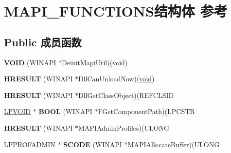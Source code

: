 \hypertarget{struct_m_a_p_i___f_u_n_c_t_i_o_n_s}{}\section{M\+A\+P\+I\+\_\+\+F\+U\+N\+C\+T\+I\+O\+N\+S结构体 参考}
\label{struct_m_a_p_i___f_u_n_c_t_i_o_n_s}
\subsection*{Public 成员函数}
\begin{DoxyCompactItemize}
\item 
\mbox{\label{struct_m_a_p_i___f_u_n_c_t_i_o_n_s_a7bc11772e8a393cb45c678e6265dc863}} 
{\bfseries V\+O\+ID} (W\+I\+N\+A\+PI $\ast$Deinit\+Mapi\+Util)(\hyperlink{interfacevoid}{void})
\item 
\mbox{\label{struct_m_a_p_i___f_u_n_c_t_i_o_n_s_ab2d2cef075f8a6b97ca29705ed10bcbe}} 
{\bfseries H\+R\+E\+S\+U\+LT} (W\+I\+N\+A\+PI $\ast$Dll\+Can\+Unload\+Now)(\hyperlink{interfacevoid}{void})
\item 
\mbox{\label{struct_m_a_p_i___f_u_n_c_t_i_o_n_s_adbef5dc7f5a28db9e40862bcf14affb4}} 
{\bfseries H\+R\+E\+S\+U\+LT} (W\+I\+N\+A\+PI $\ast$Dll\+Get\+Class\+Object)(R\+E\+F\+C\+L\+S\+ID
\item 
\mbox{\label{struct_m_a_p_i___f_u_n_c_t_i_o_n_s_a604dea537b95de631f6df51cc5f2ee09}} 
\hyperlink{interfacevoid}{L\+P\+V\+O\+ID} $\ast$ {\bfseries B\+O\+OL} (W\+I\+N\+A\+PI $\ast$F\+Get\+Component\+Path)(L\+P\+C\+S\+TR
\item 
\mbox{\label{struct_m_a_p_i___f_u_n_c_t_i_o_n_s_abf0c0469ec07a34acf4768b3402a3d74}} 
{\bfseries H\+R\+E\+S\+U\+LT} (W\+I\+N\+A\+PI $\ast$M\+A\+P\+I\+Admin\+Profiles)(U\+L\+O\+NG
\item 
\mbox{\label{struct_m_a_p_i___f_u_n_c_t_i_o_n_s_a07976e8e7e2cfffe04b00ad7851824f4}} 
L\+P\+P\+R\+O\+F\+A\+D\+M\+IN $\ast$ {\bfseries S\+C\+O\+DE} (W\+I\+N\+A\+PI $\ast$M\+A\+P\+I\+Allocate\+Buffer)(U\+L\+O\+NG

\end{DoxyCompactItemize}
